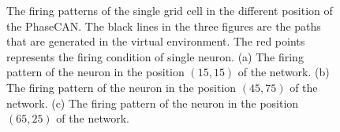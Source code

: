 \documentclass[final,5p,times,twocolumn,authoryear]{elsarticle}
\begin{document}
\begin{figure}[!t]
	\subfigcapskip=-10pt %
	\centering
	\hspace{-8mm}
	\hspace{-8mm}
	\caption{The firing patterns of the single grid cell in the different position of the PhaseCAN. The black lines in the three figures are the paths that are generated in the virtual environment. The red points represents the firing condition of single neuron. (a) The firing pattern of the neuron in the position $(15,15)$ of the network. (b) The firing pattern of the neuron in the position $(45,75)$ of the network. (c) The firing pattern of the neuron in the position $(65,25)$ of the network.}
	\label{fig:single_neuron_firing}
\end{figure}
\end{document}
